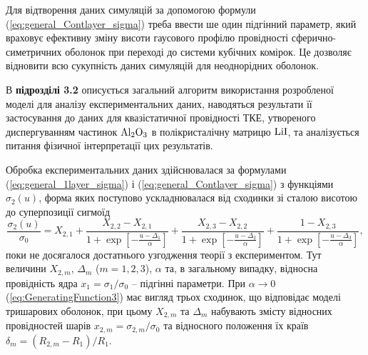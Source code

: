 \documentclass[twoside,a4paper,14pt]{vakaref}
\begin{document}
Для відтворення даних симуляцій \cite{Siekierski2006} за допомогою формули (\ref{eq:general_Contlayer_sigma}) треба ввести ше один підгінний параметр, який враховує ефективну зміну висоти  гаусового профілю провідності сферично-симетричних оболонок при переході до системи кубічних комірок. Це дозволяє відновити всю сукупність даних симуляцій \cite{Siekierski2006} для неоднорідних оболонок.

В {\bf підрозділі 3.2} описується загальний алгоритм використання розробленої моделі для аналізу експериментальних даних, наводяться результати її застосуван\-ня до даних \cite{Liang1973} для квазістатичної провідності ТКЕ, утвореного диспергуванням частинок $\rm Al_2O_3$ в полікристалічну матрицю $\rm LiI$, та аналізується питання фізичної інтерпретації цих результатів.

Обробка експериментальних даних здійснювалася за формулами (\ref{eq:general_1layer_sigma}) і (\ref{eq:general_Contlayer_sigma}) з функціями $\sigma_2(u)$, форма яких поступово ускладнювалася від сходинки зі сталою висотою до суперпозиції сигмоїд
\begin{equation}\label{eq:GeneratingFunction3}
\frac{\sigma_2(u)}{\sigma_0} = X_{2,1} +
\frac{X_{2,2}-X_{2,1}}
{1+\exp\left[-\frac{u-\Delta_1}{\alpha}\right]}
+\frac{X_{2,3}-X_{2,2}}{1+\exp\left[-\frac{u-\Delta_2}{\alpha}\right]}
+\frac{1-X_{2,3}}{1+\exp\left[-\frac{u-\Delta_3}{\alpha}\right]},
\end{equation}
поки не досягалося достатнього узгодження теорії з експериментом. Тут величини $X_{2,m}$, $\Delta_m$ ($m=1,2,3$), $\alpha$ та, в загальному випадку, відносна провідність ядра $x_1=\sigma_1/\sigma_0$ -- підгінні параметри. При $\alpha \to 0$ (\ref{eq:GeneratingFunction3}) має вигляд трьох сходинок, що відповідає моделі тришарових оболонок, при цьому $X_{2,m}$ та $\Delta_m$ набувають змісту відносних провідностей шарів $x_{2,m} = \sigma_{2,m}/\sigma_0$ та  відносного положення їх країв $\delta_m = (R_{2,m}-R_1)/R_1$.
\end{document}
